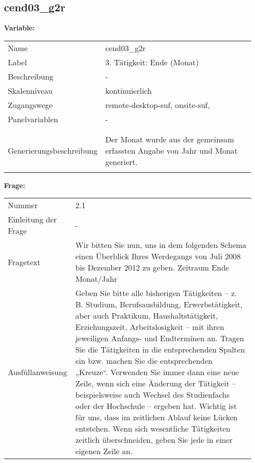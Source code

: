 	
	
	\subsection{cend03\_g2r}
	\label{subSection:cend03_g2r}

	\noindent\textbf{Variable:}\\
		\begin{tabular}{lL{11.3cm}}
			\label{tableVariable:cend03_g2r}
			Name & cend03\_g2r \\
			Label & 3. Tätigkeit: Ende (Monat) \\
			Beschreibung & - \\
			Skalenniveau & kontinuierlich \\
			Zugangswege &
				remote-desktop-suf,
				onsite-suf,
 \\
			Panelvariablen & -
			 \\
			 \\
 \\
					Generierungsbeschreibung & Der Monat wurde aus der gemeinsam erfassten Angabe von Jahr und Monat generiert. 
				 \\	
			 \\
		\end{tabular}

		\vspace*{1 cm}
		\noindent\textbf{Frage:}\\
		\begin{tabular}{lL{11.3cm}}
			\label{tableQuestion:cend03_g2r}
			Nummer & 2.1 \\
			Einleitung der Frage & - \\
			Fragetext & Wir bitten Sie nun, uns in dem folgenden Schema einen Überblick Ihres Werdegangs von Juli 2008 bis Dezember 2012 zu geben.
Zeitraum
Ende
Monat/Jahr \\
			Ausfüllanweisung & Geben Sie bitte alle bisherigen Tätigkeiten – z. B. Studium, Berufsausbildung, Erwerbstätigkeit, aber auch Praktikum, Haushaltstätigkeit,
Erziehungszeit, Arbeitslosigkeit – mit ihren jeweiligen Anfangs- und Endterminen an. Tragen Sie die Tätigkeiten in die entsprechenden Spalten ein bzw. machen Sie die entsprechenden „Kreuze“. Verwenden Sie immer dann eine neue Zeile, wenn sich eine Änderung der Tätigkeit – beispielsweise auch Wechsel des Studienfachs oder der Hochschule – ergeben hat. Wichtig ist für uns, dass im zeitlichen Ablauf keine Lücken entstehen. Wenn sich wesentliche Tätigkeiten zeitlich überschneiden, geben Sie jede in einer eigenen Zeile an. \\
		\end{tabular}




